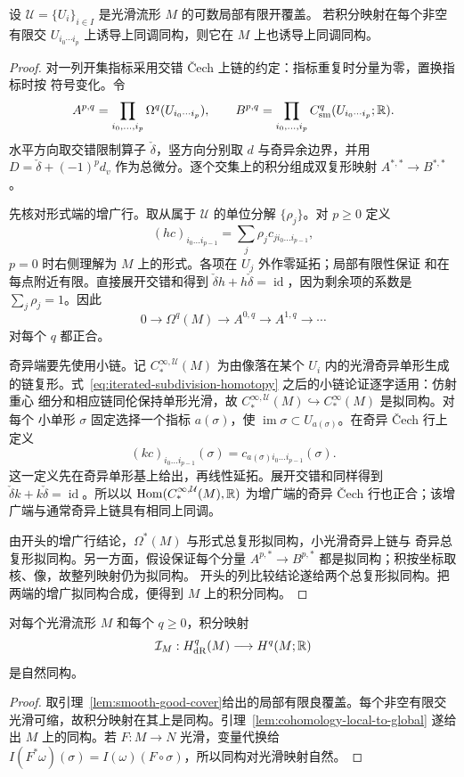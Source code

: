 \begin{lemma}\label{lem:cohomology-local-to-global}
设 $\mathcal U=\{U_i\}_{i\in I}$ 是光滑流形 $M$ 的可数局部有限开覆盖。
若积分映射在每个非空有限交 $U_{i_0\cdots i_p}$ 上诱导上同调同构，则它在
$M$ 上也诱导上同调同构。
\end{lemma}
\begin{proof}
对一列开集指标采用交错 Čech 上链的约定：指标重复时分量为零，置换指标时按
符号变化。令
\[
 A^{p,q}=\prod_{i_0,\ldots,i_p}
 \Omega^q(U_{i_0\cdots i_p}),
 \qquad
 B^{p,q}=\prod_{i_0,\ldots,i_p}
 C_{\mathrm{sm}}^q(U_{i_0\cdots i_p};\mathbb{R}).
\]
水平方向取交错限制算子 $\check\delta$，竖方向分别取 $d$ 与奇异余边界，并用
$D=\check\delta+(-1)^p d_v$ 作为总微分。逐个交集上的积分组成双复形映射
$A^{*,*}\to B^{*,*}$。

先核对形式端的增广行。取从属于 $\mathcal U$ 的单位分解 $\{\rho_j\}$。对
$p\geq0$ 定义
\[
 (hc)_{i_0\ldots i_{p-1}}
 =\sum_j\rho_j c_{j i_0\ldots i_{p-1}},
\]
$p=0$ 时右侧理解为 $M$ 上的形式。各项在 $U_j$ 外作零延拓；局部有限性保证
和在每点附近有限。直接展开交错和得到
$\check\delta h+h\check\delta=\operatorname{id}$，因为剩余项的系数是
$\sum_j\rho_j=1$。因此
\[
 0\to\Omega^q(M)\to A^{0,q}\to A^{1,q}\to\cdots
\]
对每个 $q$ 都正合。

奇异端要先使用小链。记 $C_*^{\infty,\mathcal U}(M)$ 为由像落在某个
$U_i$ 内的光滑奇异单形生成的链复形。式~\eqref{eq:iterated-subdivision-homotopy}
之后的小链论证逐字适用：仿射重心
细分和相应链同伦保持单形光滑，故
$C_*^{\infty,\mathcal U}(M)\hookrightarrow C_*^\infty(M)$ 是拟同构。对每个
小单形 $\sigma$ 固定选择一个指标 $a(\sigma)$，使
$\operatorname{im}\sigma\subset U_{a(\sigma)}$。在奇异 Čech 行上定义
\[
 (kc)_{i_0\ldots i_{p-1}}(\sigma)
 =c_{a(\sigma)i_0\ldots i_{p-1}}(\sigma).
\]
这一定义先在奇异单形基上给出，再线性延拓。展开交错和同样得到
$\check\delta k+k\check\delta=\operatorname{id}$。所以以
$\operatorname{Hom}(C_*^{\infty,\mathcal U}(M),\mathbb{R})$ 为增广端的奇异 Čech
行也正合；该增广端与通常奇异上链具有相同上同调。

由开头的增广行结论，$\Omega^*(M)$ 与形式总复形拟同构，小光滑奇异上链与
奇异总复形拟同构。另一方面，假设保证每个分量
$A^{p,*}\to B^{p,*}$ 都是拟同构；积按坐标取核、像，故整列映射仍为拟同构。
开头的列比较结论遂给两个总复形拟同构。把两端的增广拟同构合成，便得到
$M$ 上的积分同构。
\end{proof}

\begin{theorem}[de Rham 定理]\label{thm:de-rham}
对每个光滑流形 $M$ 和每个 $q\ge0$，积分映射
\[
 \mathcal I_M:H_{\mathrm{dR}}^q(M)\longrightarrow H^q(M;\mathbb{R})
\]
是自然同构。
\end{theorem}
\begin{proof}
取引理~\ref{lem:smooth-good-cover}给出的局部有限良覆盖。每个非空有限交
光滑可缩，故积分映射在其上是同构。引理~\ref{lem:cohomology-local-to-global}
遂给出 $M$ 上的同构。若 $F:M\to N$ 光滑，变量代换给
$I(F^*\omega)(\sigma)=I(\omega)(F\circ\sigma)$，所以同构对光滑映射自然。
\end{proof}

